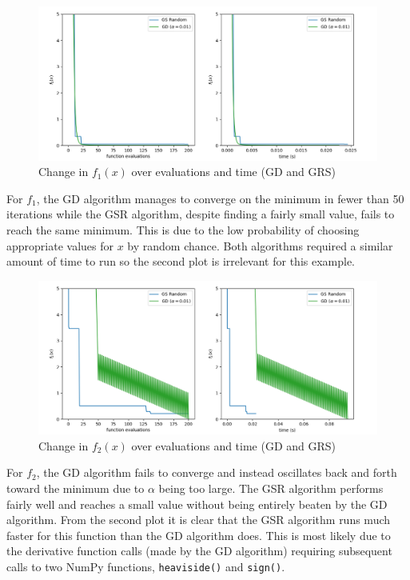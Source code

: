 \documentclass[12pt]{article}
\begin{document}
\begin{figure}[h]
    \centering
    \includegraphics[scale=0.55]{figs/ab/a_ii_1.png}
    \caption{Change in $f_1(x)$ over evaluations and time (GD and GRS)}
    \label{fig:a_ii_1}
\end{figure}

For $f_1$, the GD algorithm manages to converge on the minimum in fewer than 50 iterations while the GSR algorithm, despite finding a fairly small value, fails to reach the same minimum. This is due to the low probability of choosing appropriate values for $x$ by random chance. Both algorithms required a similar amount of time to run so the second plot is irrelevant for this example.

\begin{figure}[h]
    \centering
    \includegraphics[scale=0.55]{figs/ab/a_ii_2.png}
    \caption{Change in $f_2(x)$ over evaluations and time (GD and GRS)}
    \label{fig:a_ii_2}
\end{figure}

For $f_2$, the GD algorithm fails to converge and instead oscillates back and forth toward the minimum due to $\alpha$ being too large. The GSR algorithm performs fairly well and reaches a small value without being entirely beaten by the GD algorithm. From the second plot it is clear that the GSR algorithm runs much faster for this function than the GD algorithm does. This is most likely due to the derivative function calls (made by the GD algorithm) requiring subsequent calls to two NumPy functions, \texttt{heaviside()} and \texttt{sign()}.
\end{document}
